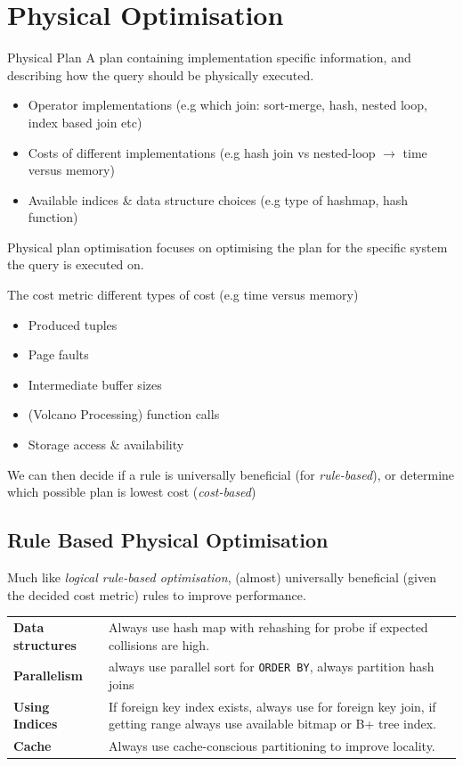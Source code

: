 \section{Physical Optimisation}
\begin{definitionbox}{Physical Plan}
    A plan containing implementation specific information, and describing how the query should be physically executed.
    \begin{itemize}
        \item Operator implementations (e.g which join: sort-merge, hash, nested loop, index based join etc)
        \item Costs of different implementations (e.g hash join vs nested-loop $\to$ time versus memory)
        \item Available indices \& data structure choices (e.g type of hashmap, hash function)
    \end{itemize}
    Physical plan optimisation focuses on optimising the plan for the specific system the query is executed on.
\end{definitionbox}

The cost metric different types of cost (e.g time versus memory)
\begin{itemize}
    \item Produced tuples
    \item Page faults
    \item Intermediate buffer sizes
    \item (Volcano Processing) function calls
    \item Storage access \& availability
\end{itemize}
We can then decide if a rule is universally beneficial (for \textit{rule-based}), or determine which possible plan is lowest cost (\textit{cost-based})

\subsection{Rule Based Physical Optimisation}
Much like \textit{logical rule-based optimisation}, (almost) universally beneficial (given the decided cost metric) rules to improve performance.
\begin{center}
    \begin{tabular}{l p{}}
        \textbf{Data structures} & Always use hash map with rehashing for probe if expected collisions are high.                                                \\
        \textbf{Parallelism}     & always use parallel sort for \texttt{ORDER BY}, always partition hash joins                                         \\
        \textbf{Using Indices}   & If foreign key index exists, always use for foreign key join, if getting range always use available bitmap or B+ tree index. \\
        \textbf{Cache}           & Always use cache-conscious partitioning to improve locality.                                                                 \\
    \end{tabular}
\end{center}

